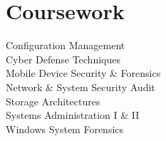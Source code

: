 \documentclass[]{deedy-resume-openfont}
\begin{document}
\begin{minipage}[t]{0.33\textwidth}



\section{Coursework}
Configuration Management \\
Cyber Defense Techniques \\
Mobile Device Security \& Forensics \\
Network \& System Security Audit \\
Storage Architectures \\
Systems Administration I \& II \\
Windows System Forensics
\sectionsep
\vspace{-2mm}



\end{minipage}
\end{document}
